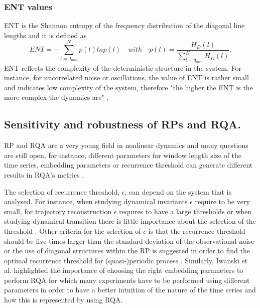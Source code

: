 \documentclass[fleqn,10pt]{wlscirep}
\begin{document}
\subsubsection*{ENT values}
ENT is the Shannon entropy of the frequency distribution of the diagonal 
line lengths and it is defined as
\begin{equation}
ENT= - \sum^{N}_{l=d_{min}} p(l) ln p(l) \quad with 
	\quad p(l)=\frac{ H_D(l) }{ \sum^{N}_{ l=d_{min} } H_D(l) }.
\end{equation}
ENT reflects the complexity of the deterministic structure in the system.
For instance, for uncorrelated noise or oscillations, 
the value of ENT is rather small and indicates low complexity of the system,
therefore "the higher the ENT is the more complex the dynamics are" 
\cite{marwan2007, marwan2015}.
%
%

 
\subsection*{Sensitivity and robustness of RPs and RQA.}
RP and RQA are a very young field in nonlinear dynamics and many questions 
are still open, for instance, different parameters for window length size 
of the time series, embedding parameters or recurrence threshold can 
generate different results in RQA's metrics \cite{marwan2011, eckmann1987}.

The selection of recurrence threshold, $\epsilon$, can depend on the system 
that is analysed. For instance, when studying dynamical invariants $\epsilon$ 
require to be very small, for trajectory reconstruction $\epsilon$ requires 
to have a large thresholds or when studying dynamical transition 
there is little importance about the selection of the threshold 
\cite{marwan2011}. Other criteria for the selection of $\epsilon$ is that 
the recurrence threshold  should be five times larger 
than the standard deviation of the observational noise
or the use of diagonal structures within the RP is suggested in order
to find the optimal recurrence threshold for (quasi-)periodic process 
\cite{marwan2011}.
Similarly, Iwanski et al. \cite{iwanski1998} highlighted the importance 
of choosing the right embedding parameters to perform RQA for which 
many experiments have to be performed using different parameters in order 
to have a better intuition of the nature of the time series and how 
this is represented by using RQA.
\end{document}
